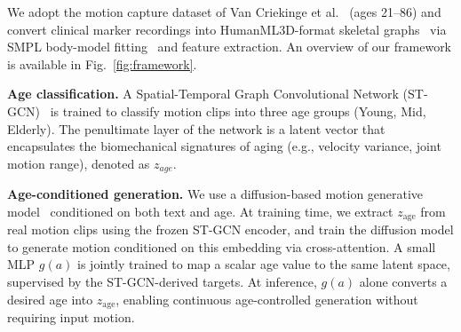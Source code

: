 We adopt the motion capture dataset of Van Criekinge et
al.~\cite{vancriekinge2023dataset} (ages 21--86) and
convert clinical marker recordings into HumanML3D-format
skeletal graphs~\cite{guo2022generating} via SMPL body-model
fitting~\cite{mahmood2019amass} and feature extraction.
An overview of our framework is available in
Fig.~\ref{fig:framework}.


\textbf{Age classification.}
A Spatial-Temporal Graph Convolutional Network (ST-GCN)~\cite{yan2018stgcn} is trained to classify motion clips into three age groups (Young, Mid, Elderly).  The penultimate layer of the network is a latent vector that encapsulates the biomechanical signatures of aging (e.g., velocity variance, joint motion range), denoted as $z_{age}$.


\textbf{Age-conditioned generation.}
We use a diffusion-based motion generative
model~\cite{tevet2023human, chen2022mld} conditioned on
both text and age. At training time, we extract
$z_\text{age}$ from real motion clips using the frozen
ST-GCN encoder, and train the diffusion model to generate
motion conditioned on this embedding via cross-attention.
A small MLP $g(a)$ is jointly trained to map a scalar age
value to the same latent space, supervised by the
ST-GCN-derived targets. At inference, $g(a)$ alone converts
a desired age into $z_\text{age}$, enabling continuous
age-controlled generation without requiring input motion.
